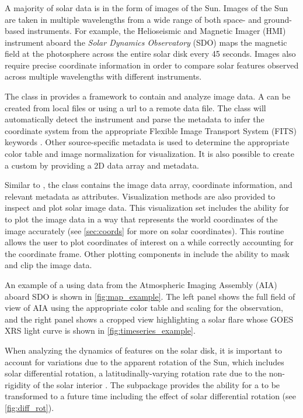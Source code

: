 \subsubsection{\Map}
\label{sec:map}
A majority of solar data is in the form of images of the Sun.
Images of the Sun are taken in multiple wavelengths from a wide range of both space- and ground- based instruments.
For example, the Helioseismic and Magnetic Imager (HMI) instrument aboard the \textit{Solar Dynamics Observatory} (SDO) maps the magnetic field at the photosphere across the entire solar disk every 45 seconds.
Images also require precise coordinate information in order to compare solar features observed across multiple wavelengths with different instruments.

The \Map class in \sunpypkg provides a framework to contain and analyze image data.
A \Map can be created from local files or using a url to a remote data file.
The \Map class will automatically detect the instrument and parse the metadata to infer the coordinate system from the appropriate Flexible Image Transport System (FITS) keywords \citep{refId0, 2006A&A...449..791T}.
Other source-specific metadata is used to determine the appropriate color table and image normalization for visualization.
It is also possible to create a custom \Map by providing a 2D data array and metadata.

Similar to \Timeseries, the \Map class contains the image data array, coordinate information, and relevant metadata as attributes.
Visualization methods are also provided to inspect and plot solar image data.
This visualization set includes the ability for \Map to plot the image data in a way that represents the world coordinates of the image accurately (see \autoref{sec:coords} for more on solar coordinates).
This routine allows the user to plot coordinates of interest on a \Map while correctly accounting for the coordinate frame.
Other plotting components in \Map include the ability to mask and clip the image data.

An example of a \Map using data from the Atmospheric Imaging Assembly (AIA) aboard SDO is shown in \autoref{fig:map_example}.
The left panel shows the full field of view of AIA using the appropriate color table and scaling for the observation, and the right panel shows a cropped view highlighting a solar flare whose GOES XRS light curve is shown in \autoref{fig:timeseries_example}.

When analyzing the dynamics of features on the solar disk, it is important to account for variations due to the apparent rotation of the Sun, which includes solar differential rotation, a latitudinally-varying rotation rate due to the non-rigidity of the solar interior \citep[see][]{Beck2000}.
The  subpackage provides the ability for a \Map to be transformed to a future time including the effect of solar differential rotation (see \autoref{fig:diff_rot}).

